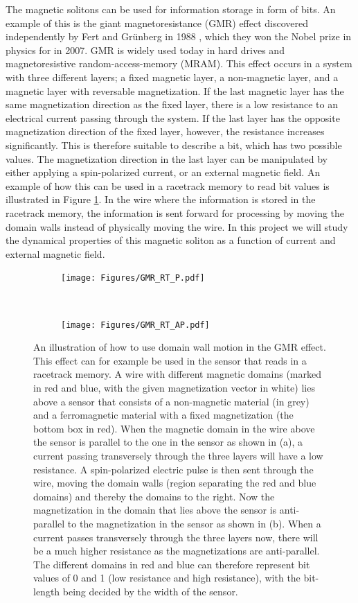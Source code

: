 \documentclass[12pt, a4paper, twoside, openright]{article}		%
\numberwithin{equation}{section}
\begin{document}
The magnetic solitons can be used for information storage in form of bits. An example of this is the giant magnetoresistance (GMR) effect discovered independently by Fert and Gr\"{u}nberg in 1988 \cite{Fert1988} \cite{Grunberg1989}, which they won the Nobel prize in physics for in 2007. GMR is widely used today in hard drives and magnetoresistive random-access-memory (MRAM). This effect occurs in a system with three different layers; a fixed magnetic layer, a non-magnetic layer, and a magnetic layer with reversable magnetization. If the last magnetic layer has the same magnetization direction as the fixed layer, there is a low resistance to an electrical current passing through the system. If the last layer has the opposite magnetization direction of the fixed layer, however, the resistance increases significantly. This is therefore suitable to describe a bit, which has two possible values. The magnetization direction in the last layer can be manipulated by either applying a spin-polarized current, or an external magnetic field. An example of how this can be used in a racetrack memory \cite{Parkin2008} to read bit values is illustrated in Figure \ref{fig:GMR}. In the wire where the information is stored in the racetrack memory, the information is sent forward for processing by moving the domain walls instead of physically moving the wire. In this project we will study the dynamical properties of this magnetic soliton as a function of current and external magnetic field.

\begin{figure}[h!]
\centering
\begin{subfigure}{.7\textwidth}
  \centering
  \texttt{[image: Figures/GMR\_RT\_P.pdf]}
  \caption{}
\end{subfigure}\\
\begin{subfigure}{.7\textwidth}
  \centering
  \texttt{[image: Figures/GMR\_RT\_AP.pdf]}
  \caption{}
\end{subfigure}
\caption{An illustration of how to use domain wall motion in the GMR effect. This effect can for example be used in the sensor that reads in a racetrack memory. A wire with different magnetic domains (marked in red and blue, with the given magnetization vector in white) lies above a sensor that consists of a non-magnetic material (in grey) and a ferromagnetic material with a fixed magnetization (the bottom box in red). When the magnetic domain in the wire above the sensor is parallel to the one in the sensor as shown in (a), a current passing transversely through the three layers will have a low resistance. A spin-polarized electric pulse is then sent through the wire, moving the domain walls (region separating the red and blue domains) and thereby the domains to the right. Now the magnetization in the domain that lies above the sensor is anti-parallel to the magnetization in the sensor as shown in (b). When a current passes transversely through the three layers now, there will be a much higher resistance as the magnetizations are anti-parallel. The different domains in red and blue can therefore represent bit values of 0 and 1 (low resistance and high resistance), with the bit-length being decided by the width of the sensor.}
\label{fig:GMR}
\end{figure}
\end{document}
